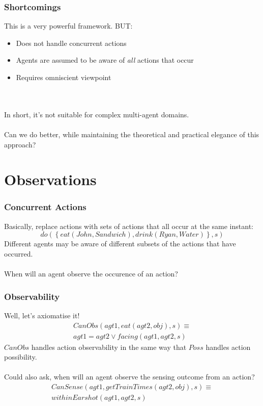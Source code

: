 \documentclass{beamer}
\begin{document}
\begin{frame}
\frametitle{Shortcomings}
This is a very powerful framework.  BUT:
\begin{itemize}
 \item Does not handle concurrent actions
 \item Agents are assumed to be aware of \emph{all} actions that occur
 \item Requires omniscient viewpoint
\end{itemize}
\ \\
\ \\
\pause
In short, it's not suitable for complex multi-agent domains.
\ \\
\ \\
Can we do better, while maintaining the theoretical and practical elegance
of this approach?
\end{frame}

\section{Observations}

\begin{frame}
\frametitle{Concurrent Actions}
Basically, replace actions with sets of actions that all occur at the same
instant:
\begin{equation*}
  do(\left\{eat(John,Sandwich),drink(Ryan,Water)\right\},s)
\end{equation*}
\pause
Different agents may be aware of different subsets of the actions that
have occurred.
\ \\
\ \\
When will an agent observe the occurence of an action?
\end{frame}

\begin{frame}
\frametitle{Observability}
Well, let's axiomatise it!
\begin{multline*}
  CanObs(agt1,eat(agt2,obj),s) \equiv \\
     agt1=agt2 \vee facing(agt1,agt2,s)
\end{multline*}
$CanObs$ handles action observability in the same way that $Poss$ handles
action possibility.
\ \\
\ \\
\pause
Could also ask, when will an agent observe the sensing outcome from an
action?
\begin{multline*}
  CanSense(agt1,getTrainTimes(agt2,obj),s) \equiv \\ withinEarshot(agt1,agt2,s)
\end{multline*}
\end{frame}
\end{document}
